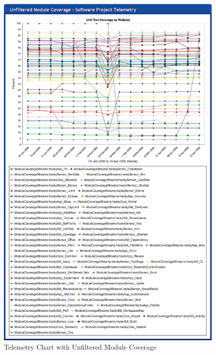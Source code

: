 \begin{figure}[p]
  \center
  \includegraphics[height=0.93\textheight]{figures/CSDL-UnfilteredCoverage}
  \caption{Telemetry Chart with Unfiltered Module Coverage} 
  \label{fig:CSDL-UnfilteredCoverage}
\end{figure}

